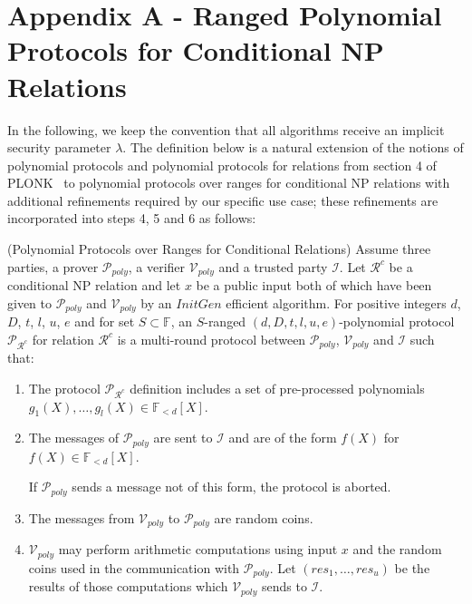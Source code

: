 \section{Appendix A - Ranged Polynomial Protocols for Conditional NP Relations}
\label{sec:poly_protocols_appendix}

\noindent In the following, we keep the convention that all algorithms receive an implicit security parameter $\lambda$. The definition below 
is a natural extension of the notions of polynomial protocols and polynomial protocols for relations from section 4 of PLONK~\cite{plonk} to 
polynomial protocols over ranges for conditional NP relations with additional refinements required by our specific use case; these refinements are 
incorporated into steps 4, 5 and 6 as follows: 

\begin{dfn}(Polynomial Protocols over Ranges for Conditional Relations)
\label{def_ranged_poly_protocol}
Assume three parties, a prover $\mathcal{P}_{poly}$, a verifier $\mathcal{V}_{poly}$ and a trusted party $\mathcal{I}$. 
Let $\mathcal{R}^c$ be a conditional NP relation and let $x$ be a public 
input both of which have been given to $\mathcal{P}_{poly}$ and $\mathcal{V}_{poly}$ by an $\mathit{InitGen}$ efficient algorithm. 
For positive integers $d$, $D$, $t$, $l$, $u$, $e$ and for set 
$S \subset \mathbb{F}$, an $S$-ranged $(d, D, t, l, u, e)$-polynomial protocol $\mathscr{P}_{\mathcal{R}^c}$ for relation $\mathcal{R}^c$ is a multi-round 
protocol between $\mathcal{P}_{poly}$, $\mathcal{V}_{poly}$ and $\mathcal{I}$ such that:

\begin{enumerate}
\item The protocol $\mathscr{P}_{\mathcal{R}^c}$ definition includes a set of pre-processed polynomials $g_1(X), \ldots, g_l(X) \in \mathbb{F}_{<d}[X]$. 

\item The messages of $\mathcal{P}_{poly}$ are sent to $\mathcal{I}$ and are of the form $f(X)$ for $f(X) \in \mathbb{F}_{<d}[X]$. 

If $\mathcal{P}_{poly}$ sends a message not of this form, the protocol is aborted.
\item The messages from $\mathcal{V}_{poly}$ to $\mathcal{P}_{poly}$ are random coins.

\item
$\mathcal{V}_{poly}$ may perform arithmetic computations using input $x$ and the random coins used in the 
communication with $\mathcal{P}_{poly}$. Let $(\mathit{res_1}, \ldots, \mathit{res_u})$ be the results of those computations 
which $\mathcal{V}_{poly}$ sends to $\mathcal{I}$. 


\end{enumerate}
\end{dfn}
